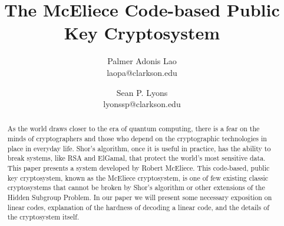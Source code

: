\documentclass[times,15pt]{article}
\theoremstyle{definition}
\begin{document}
\title{The McEliece Code-based Public Key Cryptosystem}

\author{Palmer Adonis Lao\\
 laopa@clarkson.edu\\
\and
Sean P. Lyons\\
lyonssp@clarkson.edu\\}
\maketitle
\thispagestyle{empty}

\begin{abstract}
As the world draws closer to the era of quantum computing, there is a fear on the minds of cryptographers and those who depend on the cryptographic technologies in place in everyday life.   Shor's algorithm, once it is useful in practice, has the ability to break systems, like RSA and ElGamal, that protect the world's most sensitive data.  This paper presents a system developed by Robert McEliece.  This code-based, public key cryptosystem, known as the McEliece cryptosystem, is one of few existing classic cryptosystems that cannot be broken by Shor's algorithm or other extensions of the Hidden Subgroup Problem.  In our paper we will present some necessary exposition on linear codes, explanation of the hardness of decoding a linear code, and the details of the cryptosystem itself.   
\end{abstract}
\end{document}
